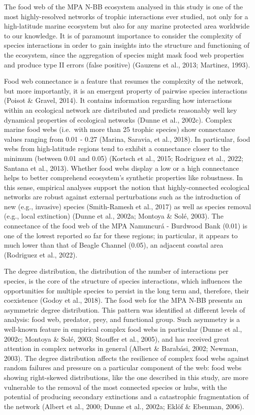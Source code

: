 \documentclass[preprint, 3p,
authoryear]{elsarticle} %
\begin{document}
The food web of the MPA N-BB ecosystem analysed in this study is one of
the most highly-resolved networks of trophic interactions ever studied,
not only for a high-latitude marine ecosystem but also for any marine
protected area worldwide to our knowledge. It is of paramount importance
to consider the complexity of species interactions in order to gain
insights into the structure and functioning of the ecosystem, since the
aggregation of species might mask food web properties and produce type
II errors (false positive) (Gauzens et al., 2013; Martinez, 1993).

Food web connectance is a feature that resumes the complexity of the
network, but more importantly, it is an emergent property of pairwise
species interactions (Poisot \& Gravel, 2014). It contains information
regarding how interactions within an ecological network are distributed
and predicts reasonably well key dynamical properties of ecological
networks (Dunne et al., 2002c). Complex marine food webs (i.e.~with more
than 25 trophic species) show connectance values ranging from 0.01 -
0.27 (Marina, Saravia, et al., 2018). In particular, food webs from
high-latitude regions tend to exhibit a connectance closer to the
minimum (between 0.01 and 0.05) (Kortsch et al., 2015; Rodriguez et al.,
2022; Santana et al., 2013). Whether food webs display a low or a high
connectance helps to better comprehend ecosystem's synthetic properties
like robustness. In this sense, empirical analyses support the notion
that highly-connected ecological networks are robust against external
perturbations such as the introduction of new (e.g., invasive) species
(Smith-Ramesh et al., 2017) as well as species removal (e.g., local
extinction) (Dunne et al., 2002a; Montoya \& Solé, 2003). The
connectance of the food web of the MPA Namuncurá - Burdwood Bank (0.01)
is one of the lowest reported so far for these regions; in particular,
it appears to much lower than that of Beagle Channel (0.05), an adjacent
coastal area (Rodriguez et al., 2022).

The degree distribution, the distribution of the number of interactions
per species, is the core of the structure of species interactions, which
influences the opportunities for multiple species to persist in the long
term and, therefore, their coexistence (Godoy et al., 2018). The food
web for the MPA N-BB presents an asymmetric degree distribution. This
pattern was identified at different levels of analysis: food web,
predator, prey, and functional group. Such asymmetry is a well-known
feature in empirical complex food webs in particular (Dunne et al.,
2002c; Montoya \& Solé, 2003; Stouffer et al., 2005), and has received
great attention in complex networks in general (Albert \& Barabási,
2002; Newman, 2003). The degree distribution affects the resilience of
complex food webs against random failures and pressure on a particular
component of the web: food webs showing right-skewed distributions, like
the one described in this study, are more vulnerable to the removal of
the most connected species or hubs, with the potential of producing
secondary extinctions and a catastrophic fragmentation of the network
(Albert et al., 2000; Dunne et al., 2002a; Eklöf \& Ebenman, 2006).
\end{document}
